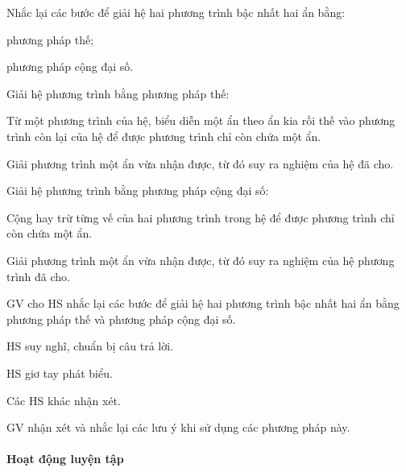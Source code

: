 \begin{ontap}
	Nhắc lại các bước để giải hệ hai phương trình bậc nhất hai ẩn bằng:
	\begin{listEX}
		\item phương pháp thế;
		\item phương pháp cộng đại số.
	\end{listEX}
	\doicot
	\begin{listEX}
		\item Giải hệ phương trình bằng phương pháp thế:
		\begin{cacbuoc}
			\item Từ một phương trình của hệ, biểu diễn một ẩn theo ẩn kia rồi thế vào phương trình còn lại của hệ để được phương trình chỉ còn chứa một ẩn.
			\item  Giải phương trình một ẩn vừa nhận được, từ đó suy ra nghiệm của hệ đã cho.
		\end{cacbuoc}
		\item Giải hệ phương trình bằng phương pháp cộng đại số:
		\begin{cacbuoc}
			\item Cộng hay trừ từng vế của hai phương trình trong hệ để được phương trình chỉ còn chứa một ẩn.
			\item Giải phương trình một ẩn vừa nhận được, từ đó suy ra nghiệm của hệ phương trình đã cho.
		\end{cacbuoc}
	\end{listEX}
\end{ontap}

\tochucthuchien

\begin{tcth}
	\buocmot
	\item GV cho HS nhắc lại các bước để giải hệ hai phương trình bậc nhất hai ẩn bằng phương pháp thế và phương pháp cộng đại số.
	\buochai
	\item HS suy nghĩ, chuẩn bị câu trả lời.
	\buocba
	\item HS giơ tay phát biểu.
	\item Các HS khác nhận xét.
	\buocbon
	\item GV nhận xét và nhắc lại các lưu ý khi sử dụng các phương pháp này.
\end{tcth}

\paragraph{Hoạt động luyện tập}

\muctieu

